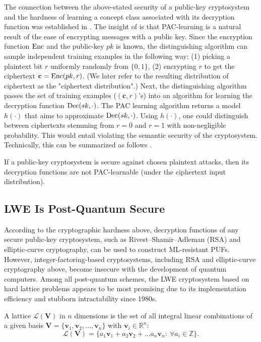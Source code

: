 The connection between the above-stated security of a public-key cryptosystem and the hardness of learning a concept class associated with its decryption function was established in \cite{kearns1994cryptographic,klivans2006cryptographic}. 
The insight of \cite{kearns1994cryptographic,klivans2006cryptographic} is that PAC-learning is a natural result of the ease of encrypting messages with a  public key. 
Since the encryption function $\Enc$ and the public-key $pk$ is known, the distinguishing algorithm can sample independent training examples in the following way: (1) picking a plaintext bit $r$ uniformly randomly from $\{0,1\}$, (2) encrypting $r$ to get the ciphertext $\mathbf{c}=\Enc(pk,r)$. (We later refer to the resulting distribution of ciphertext as the "ciphertext distribution".)
Next, the distinguishing algorithm passes the set of training examples ($(\mathbf{c},r)$'s) into an algorithm for learning the decryption function $\Dec(sk,\cdot)$.
The PAC learning algorithm returns a model $h(\cdot)$ that aims to approximate $\Dec(sk,\cdot)$. 
Using $h(\cdot)$, one could distinguish between ciphertexts stemming from $r=0$ and $r=1$ with non-negligible probability. 
This would entail violating the semantic security of the cryptosystem. 
Technically, this can be summarized as follows \cite{kearns1994cryptographic,klivans2006cryptographic}.
\begin{theorem}
\label{thm:crypto_hardness}
If a public-key cryptosystem is secure against chosen plaintext attacks, then its decryption functions are not PAC-learnable (under the ciphertext input distribution).
\end{theorem}


\subsection{LWE Is Post-Quantum Secure}
\label{sec:lwe_crypto}
According to the cryptographic hardness above, decryption functions of any secure public-key cryptosystem, such as Rivest–Shamir–Adleman (RSA) and elliptic-curve cryptography, can be used to construct ML-resistant PUFs. 
However, integer-factoring-based cryptosystems, including RSA and elliptic-curve cryptography above, become insecure with the development of quantum computers. 
Among all post-quantum schemes, %
the LWE cryptosystem based on hard lattice problems appears to be most promising due to its implementation efficiency and stubborn intractability since 1980s. 

A lattice $\mathcal{L}(\mathbf{V})$ in $n$ dimensions is the set of all integral linear combinations of a given basis $\mathbf{V}=\{\mathbf{v}_1,\mathbf{v}_2,\ldots, \mathbf{v}_n\}$ with $\mathbf{v}_i \in \mathbb{R}^n$:
\begin{equation*}
\mathcal{L}(\mathbf{V}) = \{a_1\mathbf{v}_1 + a_2\mathbf{v}_2+\ldots a_n\mathbf{v}_n: \: \forall a_i \in \mathbb{Z}\}.
\end{equation*}

